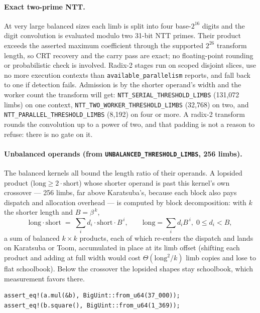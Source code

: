 \documentclass[11pt]{article}
\newcommand{\code}[1]{\texttt{#1}}
\begin{document}
\paragraph{Exact two-prime NTT.}
At very large balanced sizes each limb is split into four base-$2^{16}$
digits and the digit convolution is evaluated modulo two 31-bit NTT primes.
Their product exceeds the asserted maximum coefficient through the supported
$2^{26}$ transform length, so CRT recovery and the carry pass are exact; no
floating-point rounding or probabilistic check is involved. Radix-2 stages
run on scoped disjoint slices, use no more execution contexts than
\code{available\_parallelism} reports, and fall back to one if detection
fails. Admission is by the shorter operand's width and the worker count the
transform will get: \code{NTT\_SERIAL\_THRESHOLD\_LIMBS} (131,072 limbs) on
one context, \code{NTT\_TWO\_WORKER\_THRESHOLD\_LIMBS} (32,768) on two, and
\code{NTT\_PARALLEL\_THRESHOLD\_LIMBS} (8,192) on four or more. A radix-2
transform rounds the convolution up to a power of two, and that padding is
not a reason to refuse: there is no gate on it.

\paragraph{Unbalanced operands (from \code{UNBALANCED\_THRESHOLD\_LIMBS}, 256 limbs).}
The balanced kernels all bound the length ratio of their operands. A
lopsided product ($\text{long} \ge 2 \cdot \text{short}$) whose shorter
operand is past this kernel's own crossover --- 256 limbs, far
above Karatsuba's, because each block also pays dispatch and allocation
overhead --- is computed by block decomposition: with $k$ the shorter
length and $B = \beta^{\,k}$,
\begin{equation}
\text{long} \cdot \text{short}
  \;=\; \sum_{i} d_i \cdot \text{short} \cdot B^{\,i},
\qquad \text{long} = \sum_i d_i B^{\,i},\; 0 \le d_i < B,
\end{equation}
a sum of balanced $k \times k$ products, each of which re-enters the
dispatch and lands on Karatsuba or Toom, accumulated in place at its limb
offset (shifting each product and adding at full width would cost
$\Theta(\text{long}^2/k)$ limb copies and lose to flat schoolbook). Below
the crossover the lopsided shapes stay schoolbook, which measurement
favors there.

\begin{lstlisting}
assert_eq!(a.mul(&b), BigUint::from_u64(37_000));
assert_eq!(b.square(), BigUint::from_u64(1_369));
\end{lstlisting}
\end{document}
